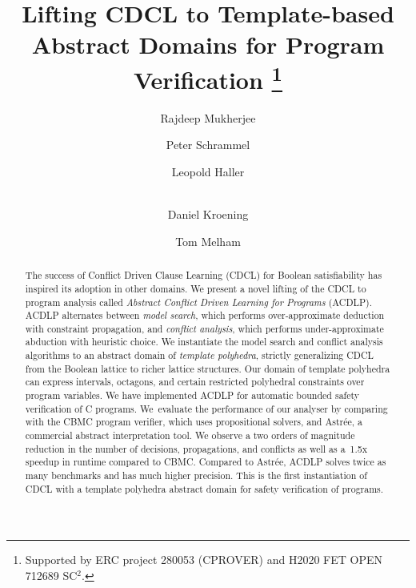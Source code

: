 \documentclass[runningheads,a4paper]{llncs}
\begin{document}
\title{Lifting CDCL to Template-based Abstract Domains
for Program Verification%
\thanks{Supported by ERC project
280053 (CPROVER) and H2020 FET OPEN 712689 SC$^2$.}}

\author{Rajdeep Mukherjee \and Peter Schrammel \and 
Leopold Haller \and \\ 
Daniel Kroening \and Tom Melham}



\maketitle

\begin{abstract}
%
The success of Conflict Driven Clause Learning (CDCL) for Boolean
satisfiability has inspired its adoption in other domains.  We present a
novel lifting of the CDCL to program analysis called \emph{Abstract Conflict
Driven Learning for Programs} (ACDLP).  ACDLP alternates between \emph{model
search}, which performs over-approximate deduction with constraint
propagation, and \emph{conflict analysis}, which performs under-approximate
abduction with heuristic choice.  We instantiate the model search and
conflict analysis algorithms to an abstract domain of \textit{template
polyhedra}, strictly generalizing CDCL from the Boolean lattice to richer
lattice structures.  Our domain of template polyhedra can express intervals,
octagons, and certain restricted polyhedral constraints over program
variables.  We have implemented ACDLP for automatic bounded safety verification 
of C programs.  We~evaluate the performance of our
analyser by comparing with the CBMC program verifier, which uses
propositional solvers, and Astr{\'e}e, a commercial abstract
interpretation tool.  We observe a two orders of magnitude reduction in the
number of decisions, propagations, and conflicts as well as a~1.5x speedup 
in runtime compared to CBMC.  Compared to Astr{\'e}e, ACDLP solves 
twice as many benchmarks and has much higher precision.
This is the first instantiation of CDCL with a template polyhedra 
abstract domain for safety verification of programs.
%
\end{abstract}
\end{document}
